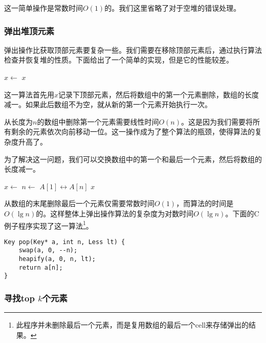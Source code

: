 \documentclass[UTF8]{article}
\begin{document}
这一简单操作是常数时间$O(1)$的。我们这里省略了对于空堆的错误处理。

\subsubsection{弹出堆顶元素}

弹出操作比获取顶部元素要复杂一些。我们需要在移除顶部元素后，通过执行算法检查并恢复堆的性质。下面给出了一个简单的实现，但是它的性能较差。

\begin{algorithmic}[1]
  \State $x \gets$ 
  \State {}
    \State {}
  \EndIf
  \State \Return $x$
\EndFunction
\end{algorithmic}

这一算法首先用$x$记录下顶部元素，然后将数组中的第一个元素删除，数组的长度减一。如果此后数组不为空，就从新的第一个元素开始执行一次。

从长度为$n$的数组中删除第一个元素需要线性时间$O(n)$。这是因为我们需要将所有剩余的元素依次向前移动一位。这一操作成为了整个算法的瓶颈，使得算法的复杂度升高了。

为了解决这一问题，我们可以交换数组中的第一个和最后一个元素，然后将数组的长度减一。

\begin{algorithmic}[1]
  \State $x \gets$ 
  \State $n \gets$ 
  \State {} $A[1] \leftrightarrow A[n]$
  \State {}
    \State {}
  \EndIf
  \State \Return $x$
\EndFunction
\end{algorithmic}

从数组的末尾删除最后一个元素仅需要常数时间$O(1)$，而算法的时间是$O(\lg n)$的。这样整体上弹出操作算法的复杂度为对数时间$O(\lg n)$。下面的C例子程序实现了这一算法\footnote{此程序并未删除最后一个元素，而是复用数组的最后一个cell来存储弹出的结果。}。

\lstset{language=C}
\begin{lstlisting}
Key pop(Key* a, int n, Less lt) {
    swap(a, 0, --n);
    heapify(a, 0, n, lt);
    return a[n];
}
\end{lstlisting}

\subsubsection{寻找top $k$个元素}
\end{document}
